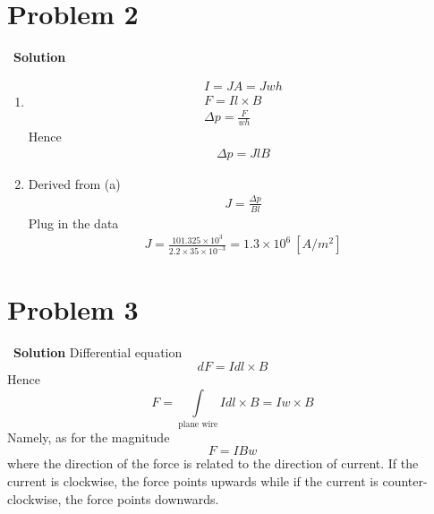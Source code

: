\documentclass[12pt,a4paper]{article}
\begin{document}
\section*{\large \textbf{Problem 2}}~{\textbf{Solution}}
    \begin{enumerate}
        \item \begin{align}
                I = JA = Jwh \\ 
                F = I\textit{l} \times B \\ 
                \Delta p = \frac{F}{wh}
            \end{align}
            Hence
            \begin{align}
                \Delta p = J\textit{l}B
            \end{align}
        \item Derived from (a)
            \begin{align*}
                J = \frac{\Delta p}{Bl}
            \end{align*}
            Plug in the data 
            \begin{align*}
                J = \frac{101.325\times 10^3}{2.2\times 35\times 10^{-3}} = 1.3\times 10^6\ [A/m^2]
            \end{align*}
    \end{enumerate}


\section*{\large \textbf{Problem 3}}~{\textbf{Solution}}
    Differential equation 
    \begin{equation}
        dF = Id\textit{l}\times B
    \end{equation}
    Hence
    \begin{equation}
        F = \int\limits_{\text{plane wire}} Id\textit{l}\times B = Iw\times B
    \end{equation}
    Namely, as for the magnitude
    \begin{equation}
        F = IBw
    \end{equation}
    where the direction of the force is related to the direction of current. If the current is clockwise, the force points upwards while if the current is counter-clockwise, the force points downwards.
\end{document}
